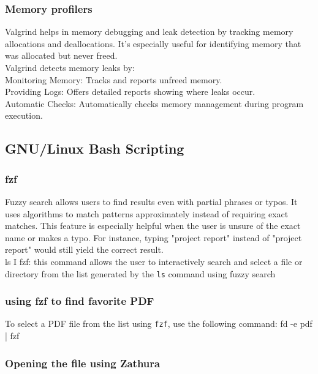 \documentclass{article}
\begin{document}
\subsubsection{Memory profilers}
Valgrind helps in memory debugging and leak detection by tracking memory allocations and deallocations. It's especially useful for identifying memory that was allocated but never freed.\\
Valgrind detects memory leaks by:\\

Monitoring Memory: Tracks and reports unfreed memory.\\

Providing Logs: Offers detailed reports showing where leaks occur.\\

Automatic Checks: Automatically checks memory management during program execution.\\

\subsection{GNU/Linux Bash Scripting}
\subsubsection{fzf}

Fuzzy search allows users to find results even with partial phrases or typos. It uses algorithms to match patterns approximately instead of requiring exact matches. This feature is especially helpful when the user is unsure of the exact name or makes a typo. For instance, typing "project report" instead of "project report" would still yield the correct result.\\
ls I fzf: this command allows the user to interactively search and select a file or directory from the list generated by the \texttt{ls} command using fuzzy search

\subsubsection{using fzf to find favorite PDF}

To select a PDF file from the list using \texttt{fzf}, use the following command: fd -e pdf | fzf\\

\subsubsection{Opening the file using Zathura}
\end{document}
